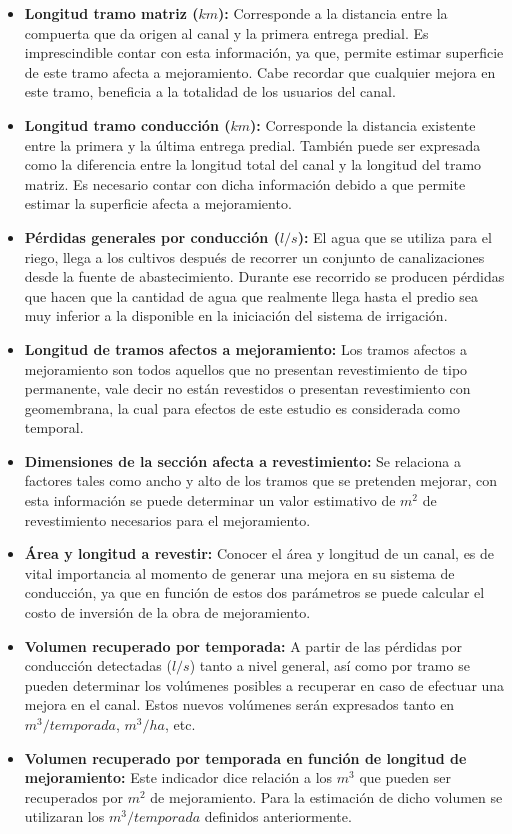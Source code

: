 \documentclass[]{article}
\begin{document}
\begin{itemize}
\item \textbf{Longitud tramo matriz ($km$):} Corresponde a la distancia entre la compuerta que da origen al canal y la primera entrega predial. Es imprescindible contar con esta información, ya que, permite estimar superficie de este tramo afecta a mejoramiento. Cabe recordar que cualquier mejora en este tramo, beneficia a la totalidad de los usuarios del canal.
\item \textbf{Longitud tramo conducción ($km$):} Corresponde la distancia existente entre la primera y la última entrega predial. También puede ser expresada como la diferencia entre la longitud total del canal y la longitud del tramo matriz. Es necesario contar con dicha información debido a que permite estimar la superficie afecta a mejoramiento.
\item \textbf{Pérdidas generales por conducción ($l/s$):} El agua que se utiliza para el riego, llega a los cultivos después de recorrer un conjunto de canalizaciones desde la fuente de abastecimiento. Durante ese recorrido se producen pérdidas que hacen que la cantidad de agua que realmente llega hasta el predio sea muy inferior a la disponible en la iniciación del sistema de irrigación.
\item \textbf{Longitud de tramos afectos a mejoramiento:} Los tramos afectos a mejoramiento son todos aquellos que no presentan revestimiento de tipo permanente, vale decir no están revestidos o presentan revestimiento con geomembrana, la cual para efectos de este estudio es considerada como temporal.
\item \textbf{Dimensiones de la sección afecta a revestimiento:} Se relaciona a factores tales como ancho y alto de los tramos que se pretenden mejorar, con esta información se puede determinar un valor estimativo de $m^2$ de revestimiento necesarios para el mejoramiento.
\item \textbf{Área y longitud a revestir:} Conocer el área y longitud de un canal, es de vital importancia al momento de generar una mejora en su sistema de conducción, ya que en función de estos dos parámetros se puede calcular el costo de inversión de la obra de mejoramiento.
\item \textbf{Volumen recuperado por temporada:} A partir de las pérdidas por conducción detectadas ($l/s$) tanto a nivel general, así como por tramo se pueden determinar los volúmenes posibles a recuperar en caso de efectuar una mejora en el canal. Estos nuevos volúmenes serán expresados tanto en $m^3/temporada$, $m^3/ha$, etc.
\item \textbf{Volumen recuperado por temporada en función de longitud de mejoramiento:} Este indicador dice relación a los $m^3$ que pueden ser recuperados por $m^2$ de mejoramiento. Para la estimación de dicho volumen se utilizaran los $m^3/temporada$ definidos anteriormente.
\end{itemize}
\end{document}
